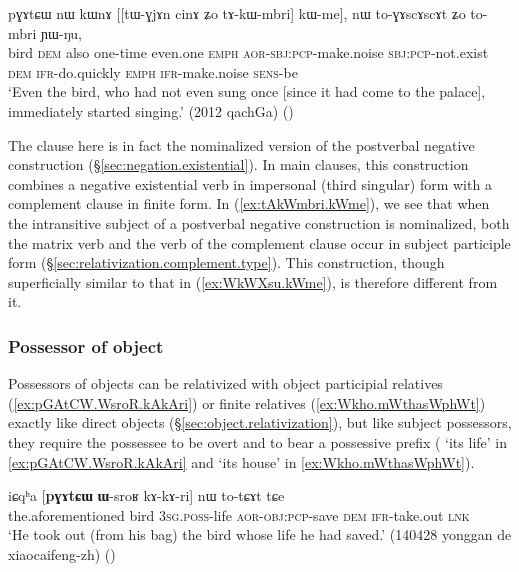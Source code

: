 \begin{exe}
\ex \label{ex:tAkWmbri.kWme}
 \gll  pɣɤtɕɯ nɯ kɯnɤ [[tɯ-ɣjɤn cinɤ ʑo tɤ-kɯ-mbri] kɯ-me], nɯ to-ɣɤscɤscɤt ʑo to-mbri ɲɯ-ŋu, \\
bird \textsc{dem} also one-time even.one \textsc{emph} \textsc{aor}-\textsc{sbj}:\textsc{pcp}-make.noise \textsc{sbj}:\textsc{pcp}-not.exist \textsc{dem} \textsc{ifr}-do.quickly \textsc{emph} \textsc{ifr}-make.noise \textsc{sens}-be \\
\glt `Even the bird, who had not even sung once [since it had come to the palace], immediately started singing.' (2012 qachGa)
()
 \end{exe}

The clause  here is in fact the nominalized version of the postverbal negative construction  (§\ref{sec:negation.existential}). In main clauses, this construction combines a negative existential verb in impersonal (third singular) form with a complement clause in finite form. In (\ref{ex:tAkWmbri.kWme}), we see that when the intransitive subject of a postverbal negative construction is nominalized, both the matrix verb  and the verb of the complement clause  occur in subject participle form (§\ref{sec:relativization.complement.type}). This construction, though superficially similar to that in (\ref{ex:WkWXsu.kWme}), is therefore different from it.


\subsubsection{Possessor of object}  \label{sec:O.possessor.relativization}
Possessors of objects can be relativized with object participial relatives (\ref{ex:pGAtCW.WsroR.kAkAri}) or finite relatives (\ref{ex:Wkho.mWthasWphWt}) exactly like direct objects (§\ref{sec:object.relativization}), but like subject possessors, they require the possessee to be overt and to bear a possessive prefix ( `its life' in \ref{ex:pGAtCW.WsroR.kAkAri} and  `its house' in \ref{ex:Wkho.mWthasWphWt}).

\begin{exe}
\ex \label{ex:pGAtCW.WsroR.kAkAri}
\gll iɕqʰa [\textbf{pɣɤtɕɯ} \textbf{ɯ}-sroʁ kɤ-kɤ-ri] nɯ to-tɕɤt tɕe \\
the.aforementioned bird  \textsc{3sg}.\textsc{poss}-life \textsc{aor}-\textsc{obj}:\textsc{pcp}-save \textsc{dem} \textsc{ifr}-take.out \textsc{lnk} \\
\glt `He took out (from his bag) the bird whose life he had saved.' (140428 yonggan de xiaocaifeng-zh)
()
\end{exe}

